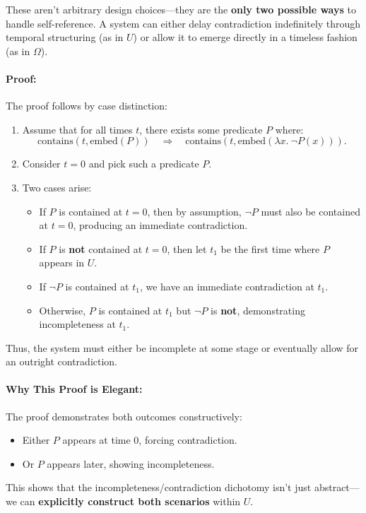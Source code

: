 \documentclass[12pt]{article}
\begin{document}
These aren't arbitrary design choices—they are the \textbf{only two possible ways} to handle self-reference. A system can either delay contradiction indefinitely through temporal structuring (as in \( U \)) or allow it to emerge directly in a timeless fashion (as in \( \Omega \)).

\paragraph{Proof:}
The proof follows by case distinction:

\begin{enumerate}
    \item Assume that for all times \( t \), there exists some predicate \( P \) where:
    \[
    \text{contains}(t, \text{embed}(P)) \quad \Rightarrow \quad \text{contains}(t, \text{embed}(\lambda x.\ \neg P(x))).
    \]
    \item Consider \( t = 0 \) and pick such a predicate \( P \).
    \item Two cases arise:
    
    \begin{itemize}
        \item If \( P \) is contained at \( t = 0 \), then by assumption, \( \neg P \) must also be contained at \( t = 0 \), producing an immediate contradiction.
        \item If \( P \) is \textbf{not} contained at \( t = 0 \), then let \( t_1 \) be the first time where \( P \) appears in \( U \).
        \item If \( \neg P \) is contained at \( t_1 \), we have an immediate contradiction at \( t_1 \).
        \item Otherwise, \( P \) is contained at \( t_1 \) but \( \neg P \) is \textbf{not}, demonstrating incompleteness at \( t_1 \).
    \end{itemize}
\end{enumerate}

Thus, the system must either be incomplete at some stage or eventually allow for an outright contradiction.

\paragraph{Why This Proof is Elegant:}
The proof demonstrates both outcomes constructively:
\begin{itemize}
    \item Either \( P \) appears at time \( 0 \), forcing contradiction.
    \item Or \( P \) appears later, showing incompleteness.
\end{itemize}
This shows that the incompleteness/contradiction dichotomy isn’t just abstract—we can \textbf{explicitly construct both scenarios} within \( U \).
\end{document}
